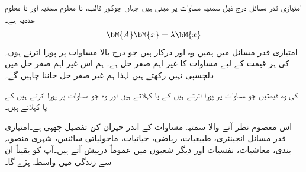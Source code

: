 امتیازی قدر مسائل درج ذیل سمتیہ  مساوات پر مبنی ہیں جہاں  چوکور قالب،  نا معلوم سمتیہ اور  نا معلوم عددیہ ہے۔
\begin{align}\label{مساوات_امتیازی_مسئلہ_الف}
\bM{A}\bM{x}=\lambda \bM{x}
\end{align}
امتیازی قدر مسائل میں ہمیں وہ  اور  درکار ہیں جو درج بالا مساوات پر پورا اترتے ہوں۔  کی ہر قیمت کے لیے 
  مساوات  کا غیر اہم صفر حل ہے۔ ہم اس غیر اہم صفر حل میں دلچسپی نہیں رکھتے ہیں لہٰذا ہم غیر صفر حل  جاننا چاہیں گے۔

 کی وہ قیمتیں جو مساوات  پر پورا اترتے ہیں  کے  یا  کہلاتے ہیں اور وہ  جو مساوات  پر پورا اترتے ہیں  کے  یا  کہلاتے ہیں۔

اس معصوم نظر آنے والا سمتیہ  مساوات کے اندر حیران کن تفصیل چھپی ہے۔امتیازی قدر مسائل انجینئری، طبیعیات، ریاضی، حیاتیات، ماحولیاتی سائنس، شہری منصوبہ بندی،  معاشیات، نفسیات اور دیگر شعبوں میں عموماً درپیش آتے ہیں۔آپ کو یقیناً ان سے زندگی میں واسطہ پڑے گا۔

